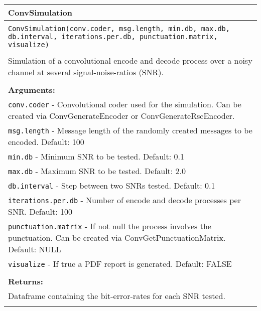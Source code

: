 \begin{longtable}{|p{\textwidth}|}
\hline
\rowcolor{lightblue}ConvSimulation\\
\hline
\\
\texttt{ConvSimulation(conv.coder, msg.length, min.db, max.db, db.interval, iterations.per.db, punctuation.matrix, visualize)}\\
\\
Simulation of a convolutional encode and decode process over a noisy channel at several signal-noise-ratios (SNR).\\
\\
\textbf{Arguments:}\\
\texttt{conv.coder} - Convolutional coder used for the simulation. Can be created via ConvGenerateEncoder or ConvGenerateRscEncoder.\\
\texttt{msg.length} - Message length of the randomly created messages to be encoded. Default: 100\\
\texttt{min.db} - Minimum SNR to be tested. Default: 0.1\\
\texttt{max.db} - Maximum SNR to be tested. Default: 2.0\\
\texttt{db.interval} - Step between two SNRs tested. Default: 0.1\\
\texttt{iterations.per.db} - Number of encode and decode processes per SNR. Default: 100\\
\texttt{punctuation.matrix} - If not null the process involves the punctuation. Can be created via ConvGetPunctuationMatrix. Default: NULL\\
\texttt{visualize} - If true a PDF report is generated. Default: FALSE\\
\\
\textbf{Returns:}\\
Dataframe containing the bit-error-rates for each SNR tested.\\
\\
\hline
\end{longtable}